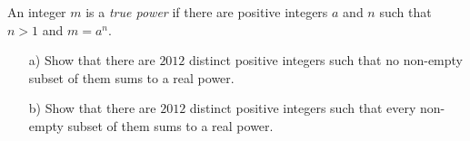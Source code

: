 An integer $m$ is a \emph{true power} if there are positive integers $a$ and $n$ such that $n>1$ and $m=a^n$.
\begin{enumerate}
    \item[a)] Show that there are $2012$ distinct positive integers such that no non-empty subset of them sums to a real power.
    \item[b)] Show that there are $2012$ distinct positive integers such that every non-empty subset of them sums to a real power.
\end{enumerate}
